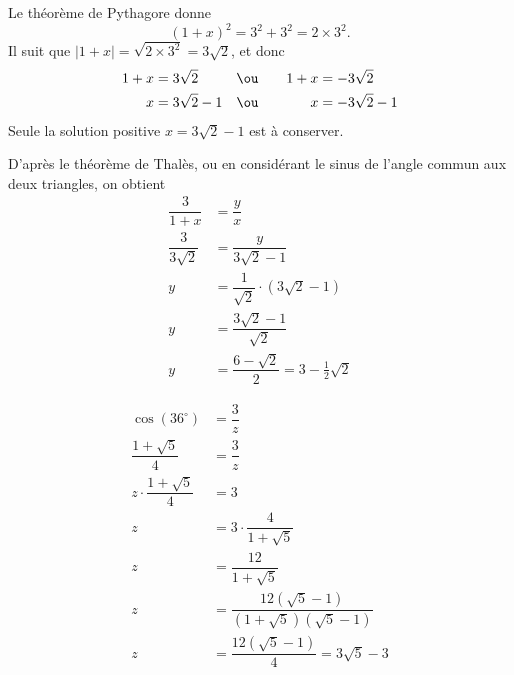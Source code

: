 \begin{Answer}[ref=exe:pyth-thalès]
	Le théorème de Pythagore donne
		\[ (1+x)^2 = 3^2 + 3^2 = 2\times3^2. \]
	Il suit que $|1+x| = \sqrt{2\times3^2} = 3\sqrt2$, et donc
		\begin{align*}
			1+x &= 3\sqrt2 && \ou && & 1+x &= -3\sqrt2 \\
			x &= 3\sqrt2-1 && \ou && & x &= -3\sqrt2-1
		\end{align*}
	Seule la solution positive $x=3\sqrt2-1$ est à conserver.
	
	D'après le théorème de Thalès, ou en considérant le sinus de l'angle commun aux deux triangles, on obtient
		\begin{align*}
			\dfrac3{1+x} &= \dfrac{y}{x} \\
			\dfrac3{3\sqrt2} &= \dfrac{y}{3\sqrt2-1} \\
			y &= \dfrac1{\sqrt2}\cdot(3\sqrt2-1) \\
			y &= \dfrac{3\sqrt2-1}{\sqrt2} \\
			y &= \dfrac{6-\sqrt2}{2} = 3 - \frac12 \sqrt2
		\end{align*}
\end{Answer}

\begin{Answer}[ref=exe:cos36]
	\begin{align*}
		\cos(36^\circ) &= \dfrac{3}z \\
		\dfrac{1+\sqrt5}4 &= \dfrac3z \\
		z \cdot \dfrac{1+\sqrt5}4 &= 3 \\
		z &= 3 \cdot \dfrac4{1+\sqrt5} \\
		z &= \dfrac{12}{1+\sqrt5}  \\
		z &= \dfrac{12(\sqrt5-1)}{(1+\sqrt5)(\sqrt5 - 1)} \\
		z &=\dfrac{12(\sqrt5-1)}{4} = 3\sqrt5 - 3
	\end{align*}

\end{Answer}



%

